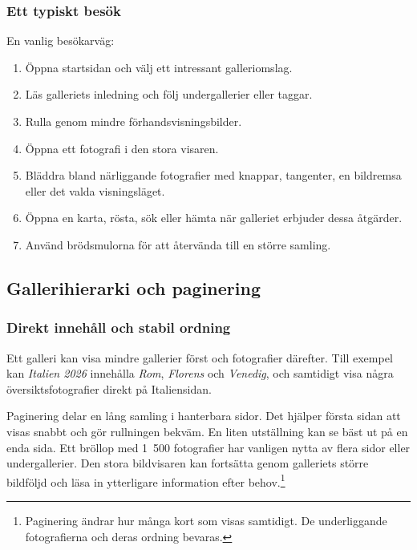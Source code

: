 \documentclass[11pt,a4paper]{article}
\begin{document}
\subsubsection{Ett typiskt besök}

En vanlig besökarväg:

\begin{enumerate}
  \item Öppna startsidan och välj ett intressant galleriomslag.
  \item Läs galleriets inledning och följ undergallerier eller taggar.
  \item Rulla genom mindre förhandsvisningsbilder.
  \item Öppna ett fotografi i den stora visaren.
  \item Bläddra bland närliggande fotografier med knappar, tangenter, en
  bildremsa eller det valda visningsläget.
  \item Öppna en karta, rösta, sök eller hämta när galleriet erbjuder dessa
  åtgärder.
  \item Använd brödsmulorna för att återvända till en större samling.
\end{enumerate}

\subsection{Gallerihierarki och paginering}

\subsubsection{Direkt innehåll och stabil ordning}

Ett galleri kan visa mindre gallerier först och fotografier därefter. Till
exempel kan \emph{Italien 2026} innehålla \emph{Rom}, \emph{Florens} och
\emph{Venedig}, och samtidigt visa några översiktsfotografier direkt på
Italiensidan.

Paginering delar en lång samling i hanterbara sidor. Det hjälper första sidan
att visas snabbt och gör rullningen bekväm. En liten utställning kan se bäst ut
på en enda sida. Ett bröllop med 1~500 fotografier har vanligen nytta av flera
sidor eller undergallerier. Den stora bildvisaren kan fortsätta genom galleriets
större bildföljd och läsa in ytterligare information efter
behov.\footnote{Paginering ändrar hur många kort som visas samtidigt. De
underliggande fotografierna och deras ordning bevaras.}
\end{document}
